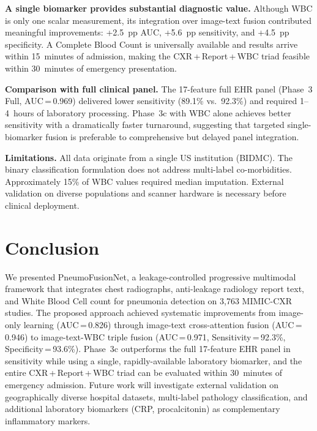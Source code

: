 \documentclass[conference]{IEEEtran}
\begin{document}
\textbf{A single biomarker provides substantial diagnostic value.} Although WBC is only one scalar measurement, its integration over image-text fusion contributed meaningful improvements: +2.5~pp AUC, +5.6~pp sensitivity, and +4.5~pp specificity. A Complete Blood Count is universally available and results arrive within 15~minutes of admission, making the CXR\,+\,Report\,+\,WBC triad feasible within 30~minutes of emergency presentation.

\textbf{Comparison with full clinical panel.} The 17-feature full EHR panel (Phase~3 Full, AUC\,=\,0.969) delivered lower sensitivity (89.1\% vs.\ 92.3\%) and required 1--4~hours of laboratory processing. Phase~3c with WBC alone achieves better sensitivity with a dramatically faster turnaround, suggesting that targeted single-biomarker fusion is preferable to comprehensive but delayed panel integration.

\textbf{Limitations.} All data originate from a single US institution (BIDMC). The binary classification formulation does not address multi-label co-morbidities. Approximately 15\% of WBC values required median imputation. External validation on diverse populations and scanner hardware is necessary before clinical deployment.

\section{\textcolor{aideep}{Conclusion}}

We presented PneumoFusionNet, a leakage-controlled progressive multimodal framework that integrates chest radiographs, anti-leakage radiology report text, and White Blood Cell count for pneumonia detection on 3{,}763 MIMIC-CXR studies. The proposed approach achieved systematic improvements from image-only learning (AUC\,=\,0.826) through image-text cross-attention fusion (AUC\,=\,0.946) to image-text-WBC triple fusion (AUC\,=\,0.971, Sensitivity\,=\,92.3\%, Specificity\,=\,93.6\%). Phase~3c outperforms the full 17-feature EHR panel in sensitivity while using a single, rapidly-available laboratory biomarker, and the entire CXR\,+\,Report\,+\,WBC triad can be evaluated within 30~minutes of emergency admission. Future work will investigate external validation on geographically diverse hospital datasets, multi-label pathology classification, and additional laboratory biomarkers (CRP, procalcitonin) as complementary inflammatory markers.
\end{document}
